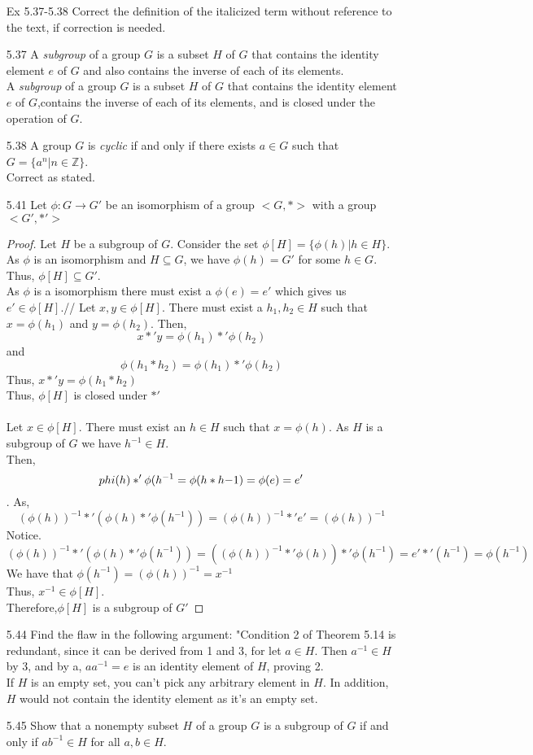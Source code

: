 \documentclass[12pt]{article}
\newcommand{\Z}{\mathds{Z}}
\begin{document}
\begin{enumerate}
		\item[Ex 5.37-5.38] Correct the definition of the italicized term without reference to the text, if correction is needed.
		\item[5.37] A \textit{subgroup} of a group $G$ is a subset $H$ of $G$ that contains the identity element $e$ of $G$ and also contains the inverse of each of its elements.\\
		A \textit{subgroup} of a group $G$ is a subset $H$ of $G$ that contains the identity element $e$ of $G$,contains the inverse of each of its elements, and is closed under the operation of $ G $.
		\item[5.38] A group $G$ is \textit{cyclic} if and only if there exists $a \in G$ such that $G = \{a^n|n\in\Z\}$.\\
		Correct as stated.
		\item[5.41] Let $\phi: G \rightarrow G'$ be an isomorphism of a group $<G, *>$ with a group $<G', *'>$
		\begin{proof}
			Let $ H $ be a subgroup of $ G $. Consider the set $ \phi[H]=\{\phi(h)|h\in H\} $. As $ \phi $ is an isomorphism and $ H \subseteq G $, we have $ \phi(h)=G' $ for some $ h\in G $. Thus, $ \phi[H] \subseteq G' $.\\
			As $ \phi $ is a isomorphism there must exist a $ \phi(e)=e' $ which gives us $ e' \in \phi[H] $.//
			Let $ x,y\in\phi[H] $. There must exist a $ h_1,h_2\in H $ such that $ x=\phi(h_1) $ and $ y=\phi(h_2) $. Then, 
				\[x*'y=\phi(h_1)*'\phi(h_2)\]
			and \[\phi(h_1*h_2)=\phi(h_1)*'\phi(h_2)\]
			Thus, $ x*'y=\phi(h_1*h_2) $\\
			Thus, $ \phi[H] $ is closed under $ *' $\\
			\\
			Let $ x\in\phi[H] $. There must exist an $ h\in H $ such that $ x=\phi(h) $. As $ H $ is a subgroup of $ G $ we have $ h^{-1}\in H $.\\
			Then, 
			\[\\phi(h)*'\phi(h^{-1}=\phi(h*h{-1})=\phi(e)=e'\].
			As,
				\[(\phi(h))^{-1}*'(\phi(h)*'\phi(h^{-1})) =(\phi(h))^{-1}*'e'=(\phi(h))^{-1}\]
			Notice.
				\[(\phi(h))^{-1}*'(\phi(h)*'\phi(h^{-1}))=((\phi(h))^{-1}*'\phi(h))*'\phi(h^{-1})=e'*'(h^{-1})=\phi(h^{-1})\]
			We have that $ \phi(h^{-1})=(\phi(h))^{-1}=x^{-1} $\\
			Thus, $ x^{-1}\in\phi[H]$.\\
			
			Therefore,$ \phi[H]$ is a subgroup of $ G' $ 
		\end{proof}
		\item[5.44] Find the flaw in the following argument: "Condition 2 of Theorem 5.14 is redundant, since it can be derived from 1 and 3, for let $a \in H$. Then $a^{-1}\in H$ by 3, and by a, $aa^{-1} = e$ is an identity element of $H$, proving 2.\\
		If $ H $ is an empty set, you can't pick any arbitrary element in $ H $. In addition, $ H $ would not contain the identity element as it's an empty set.
		\item[5.45] Show that a nonempty subset $H$ of a group $G$ is a subgroup of $G$ if and only if $ab^{-1}\in H$ for all $a,b \in H$.
		

\end{enumerate}
\end{document}
